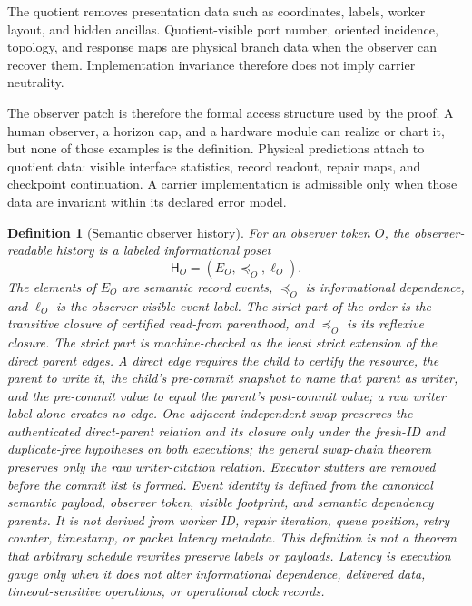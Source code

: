 \documentclass[11pt]{article}
\newcounter{none}
\newtheorem{definition}[theorem]{Definition}
\begin{document}
The quotient removes presentation data such as coordinates, labels, worker layout, and hidden
ancillas. Quotient-visible port number, oriented incidence, topology, and response maps are
physical branch data when the observer can recover them. Implementation invariance therefore does
not imply carrier neutrality.

The observer patch is therefore the formal access structure used by the proof. A human observer, a
horizon cap, and a hardware module can realize or chart it, but none of those examples is the
definition. Physical predictions attach to quotient data: visible interface statistics, record
readout, repair maps, and checkpoint continuation. A carrier implementation is admissible only when
those data are invariant within its declared error model.

\begin{definition}[Semantic observer history]\label{def:semantic-observer-history}
For an observer token \(O\), the observer-readable history is a labeled informational poset
\[
\mathsf H_O=(E_O,\preceq_O,\ell_O).
\]
The elements of \(E_O\) are semantic record events, \(\preceq_O\) is informational
dependence, and \(\ell_O\) is the observer-visible event label. The strict part
of the order is the transitive closure of certified read-from parenthood, and
\(\preceq_O\) is its reflexive closure. The strict part is machine-checked as
the least strict extension of the direct parent edges. A direct edge requires
the child to certify the resource, the parent to write it, the child's
pre-commit snapshot to name that parent as writer, and the pre-commit value to
equal the parent's post-commit value; a raw writer label alone creates no
edge. One adjacent independent swap preserves the authenticated direct-parent
relation and its closure only under the fresh-ID and duplicate-free hypotheses
on both executions; the general swap-chain theorem preserves only the raw
writer-citation relation. Executor stutters are removed before the commit list
is formed. Event identity is defined from the
canonical semantic payload, observer token, visible footprint, and semantic dependency parents. It is
not derived from worker ID, repair iteration, queue position, retry counter, timestamp, or packet
latency metadata. This definition is not a theorem that arbitrary schedule
rewrites preserve labels or payloads. Latency is execution gauge only when it does not alter informational dependence,
delivered data, timeout-sensitive operations, or operational clock records.
\end{definition}
\end{document}
